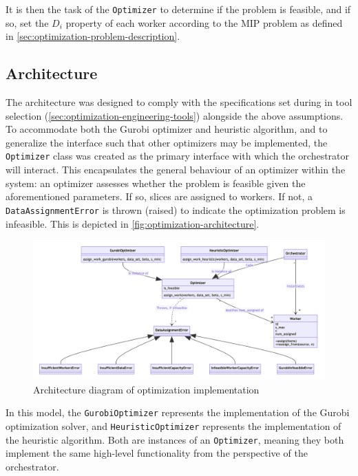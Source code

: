 \documentclass[../mthe-493-final-project.tex]{subfiles}
\begin{document}
    It is then the task of the \texttt{Optimizer} to determine if the problem is feasible, and if so, set the $D_i$ property of each worker according to the MIP problem as defined in \autoref{sec:optimization-problem-description}.
    
    \subsection{Architecture}
    \label{ssec:optimization-architecture-implementation}
    
    The architecture was designed to comply with the specifications set during in tool selection (\autoref{sec:optimization-engineering-tools}) alongside the above assumptions. To accommodate both the Gurobi optimizer and heuristic algorithm, and to generalize the interface such that other optimizers may be implemented, the \texttt{Optimizer} class was created as the primary interface with which the orchestrator will interact. This encapsulates the general behaviour of an optimizer within the system: an optimizer assesses whether the problem is feasible given the aforementioned parameters. If so, slices are assigned to workers. If not, a \texttt{DataAssignmentError} is thrown (raised) to indicate the optimization problem is infeasible. This is depicted in \autoref{fig:optimization-architecture}.
    
    \begin{figure}
        \centering
        \includegraphics{thesis/img/data_assignment.png}
        \caption{Architecture diagram of optimization implementation}
        \label{fig:optimization-architecture}
    \end{figure}
    
    In this model, the \texttt{GurobiOptimizer} represents the implementation of the Gurobi optimization solver, and \texttt{HeuristicOptimizer} represents the implementation of the heuristic algorithm. Both are instances of an \texttt{Optimizer}, meaning they both implement the same high-level functionality from the perspective of the orchestrator.
    
\end{document}
